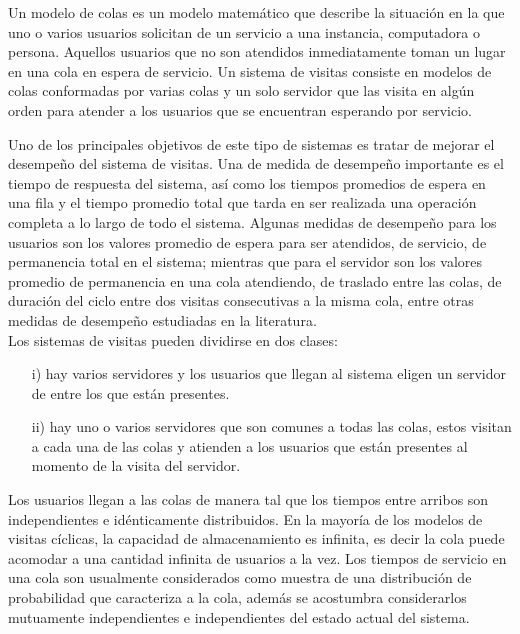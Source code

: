 \documentclass{article}
\numberwithin{equation}{section}
\begin{document}
Un modelo de colas es un modelo matem\'atico que describe la situaci\'on en la que uno o varios usuarios solicitan de un servicio a una instancia, computadora o persona. Aquellos usuarios que no son atendidos inmediatamente toman un lugar en una cola en espera de servicio. Un sistema de visitas consiste en modelos de colas conformadas por varias colas y un solo servidor que las visita en alg\'un orden para atender a los usuarios que se encuentran esperando por servicio.

Uno de los principales objetivos de este tipo de sistemas es tratar de mejorar el desempe\~no del sistema de visitas. Una de medida de desempe\~no importante es el tiempo de respuesta del sistema, as\'i como los tiempos promedios de espera en una fila y el tiempo promedio total que tarda en ser realizada una operaci\'on completa a lo largo de todo el sistema. Algunas medidas de desempe\~no para los usuarios son los valores promedio de espera para ser atendidos, de servicio, de permanencia total en el sistema; mientras que para el servidor son los valores promedio de permanencia en una cola atendiendo, de traslado entre las colas, de duraci\'on del ciclo entre dos visitas consecutivas a la misma cola, entre otras medidas de desempe\~no estudiadas en la literatura.\\

Los sistemas de visitas pueden dividirse en dos clases:
\begin{itemize}
\item[i)] hay varios servidores y los usuarios que llegan al sistema eligen un servidor de entre los que est\'an presentes.

\item[ii)] hay uno o varios servidores que son comunes a todas las colas, estos visitan a cada una de las colas y atienden a los usuarios que est\'an presentes al momento de la visita del
servidor.
\end{itemize}

Los usuarios llegan a las colas de manera tal que los tiempos entre arribos son independientes e id\'enticamente distribuidos. En la mayor\'ia de los modelos de visitas c\'iclicas, la capacidad de almacenamiento es infinita, es decir la cola puede acomodar a una cantidad infinita de usuarios a la vez. Los tiempos de servicio en una cola son usualmente considerados como muestra de una distribuci\'on de probabilidad que caracteriza a la cola, adem\'as se acostumbra considerarlos mutuamente independientes e independientes del estado actual del sistema. \\
\end{document}
